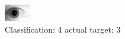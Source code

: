 \begin{figure}[h!]
\begin{center}
\includegraphics[width=0.60\columnwidth]{figures/ID1973_class_4_target_3.png}
\end{center}
\caption{ Classification: 4 actual target: 3}
\label{fig:ID1973_class_4_target_3}
\end{figure}
